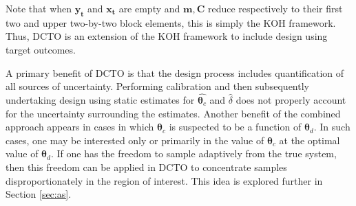 \documentclass[12pt]{article}
\begin{document}
%
Note that when $\mathbf{y_t}$ and $\mathbf{x_t}$ are empty and $\mathbf m, \mathbf C$ reduce respectively to their first two and upper two-by-two block elements, this is simply the KOH framework.
%
Thus, DCTO is an extension of the KOH framework to include design using target outcomes.
%

%
A primary benefit of DCTO is that the design process includes quantification of all sources of uncertainty.
%
Performing calibration and then subsequently undertaking design using static estimates for $\widehat{\boldsymbol\theta_c}$ and $\widehat \delta$ does not properly account for the uncertainty surrounding the estimates. 
%
Another benefit of the combined approach appears in cases in which $\boldsymbol\theta_c$ is suspected to be a function of $\boldsymbol\theta_d$.
%
In such cases, one may be interested only or primarily in the value of $\boldsymbol\theta_c$ at the optimal value of $\boldsymbol\theta_d$.
%
If one has the freedom to sample adaptively from the true system, then this freedom can be applied in DCTO to concentrate samples disproportionately in the region of interest.
%
This idea is explored further in Section \ref{sec:as}.
%
\end{document}
